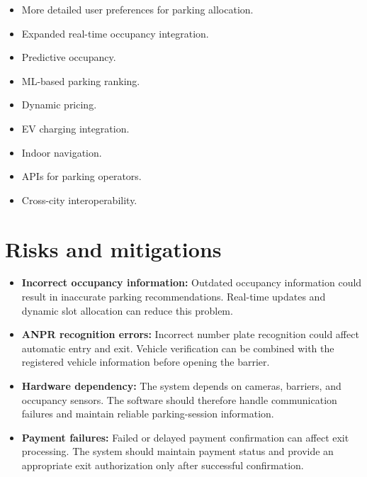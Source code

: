 \documentclass[12pt,a4paper]{article}
\begin{document}
\begin{enumerate}
\begin{itemize}
    \item More detailed user preferences for parking allocation.

    \item Expanded real-time occupancy integration.

    \item Predictive occupancy.

    \item ML-based parking ranking.

    \item Dynamic pricing.

    \item EV charging integration.

    \item Indoor navigation.

    \item APIs for parking operators.

    \item Cross-city interoperability.
\end{itemize}


\section{Risks and mitigations}

\begin{itemize}
    \item \textbf{Incorrect occupancy information:} Outdated occupancy information could result in inaccurate parking recommendations. Real-time updates and dynamic slot allocation can reduce this problem.

    \item \textbf{ANPR recognition errors:} Incorrect number plate recognition could affect automatic entry and exit. Vehicle verification can be combined with the registered vehicle information before opening the barrier.

    \item \textbf{Hardware dependency:} The system depends on cameras, barriers, and occupancy sensors. The software should therefore handle communication failures and maintain reliable parking-session information.

    \item \textbf{Payment failures:} Failed or delayed payment confirmation can affect exit processing. The system should maintain payment status and provide an appropriate exit authorization only after successful confirmation.


\end{itemize}
\end{enumerate}
\end{document}
